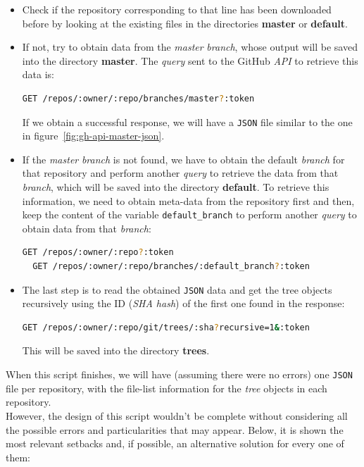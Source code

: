\documentclass[a4paper, 12pt]{book}
\begin{document}
\begin{itemize}
  \item Check if the repository corresponding to that line has been downloaded before by looking at the existing files
  in the directories \textbf{master} or \textbf{default}.
  \item If not, try to obtain data from the \emph{master} \textit{branch}, whose output will be saved into the directory
  \textbf{master}.
  The \textit{query} sent to the GitHub \textit{API} to retrieve this data is:
  \begin{lstlisting}[language=bash]
  GET /repos/:owner/:repo/branches/master?:token \end{lstlisting}
  If we obtain a successful response, we will have a \texttt{JSON} file similar to the one in figure~\ref{fig:gh-api-master-json}.
  \item If the \emph{master} \textit{branch} is not found, we have to obtain the default \textit{branch} for that repository and
  perform another \textit{query} to retrieve the data from that \textit{branch}, which will be saved into the directory \textbf{default}.
  To retrieve this information, we need to obtain meta-data from the repository first and then, keep the content
  of the variable \texttt{default\_branch} to perform another \textit{query} to obtain data from that \textit{branch}:
  \begin{lstlisting}[language=bash]
  GET /repos/:owner/:repo?:token
  GET /repos/:owner/:repo/branches/:default_branch?:token \end{lstlisting}
  \item The last step is to read the obtained \texttt{JSON} data and get the tree objects recursively using the ID
  (\textit{SHA hash}) of the first one found in the response:
  \begin{lstlisting}[language=bash]
  GET /repos/:owner/:repo/git/trees/:sha?recursive=1&:token \end{lstlisting}
  This will be saved into the directory \textbf{trees}.
\end{itemize}
When this script finishes, we will have (assuming there were no errors) one \texttt{JSON} file per repository,
with the file-list information for the \textit{tree} objects in each repository.\\
However, the design of this script wouldn't be complete without considering all the possible errors and
particularities that may appear. Below, it is shown the most relevant setbacks and, if possible, an alternative
solution for every one of them:
\end{document}
